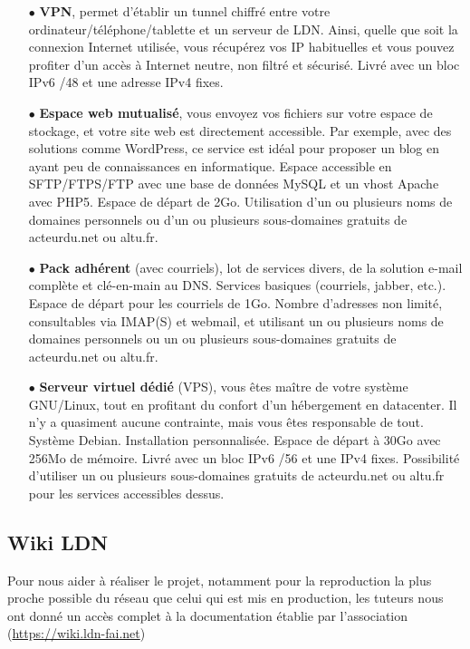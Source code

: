 		\begin{itemize}
			\item[$\bullet$] \textbf{VPN}, permet d’établir un tunnel chiffré entre votre ordinateur/téléphone/tablette et un serveur de LDN. Ainsi, quelle que soit la connexion Internet utilisée, vous récupérez vos IP habituelles et vous pouvez profiter d’un accès à Internet neutre, non filtré et sécurisé. Livré avec un bloc IPv6 /48 et une adresse IPv4 fixes.

			\item[$\bullet$] \textbf{Espace web mutualisé}, vous envoyez vos fichiers sur votre espace de stockage, et votre site web est directement accessible. Par exemple, avec des solutions comme WordPress, ce service est idéal pour proposer un blog en ayant peu de connaissances en informatique. Espace accessible en SFTP/FTPS/FTP avec une base de données MySQL et un vhost Apache avec PHP5. Espace de départ de 2Go. Utilisation d’un ou plusieurs noms de domaines personnels ou d’un ou plusieurs sous-domaines gratuits de acteurdu.net ou altu.fr.

			\item[$\bullet$] \textbf{Pack adhérent} (avec courriels), lot de services divers, de la solution e-mail complète et clé-en-main au DNS. Services basiques (courriels, jabber, etc.). Espace de départ pour les courriels de 1Go. Nombre d’adresses non limité, consultables via IMAP(S) et webmail, et utilisant un ou plusieurs noms de domaines personnels ou un ou plusieurs sous-domaines gratuits de acteurdu.net ou altu.fr.

			\item[$\bullet$] \textbf{Serveur virtuel dédié} (VPS), vous êtes maître de votre système GNU/Linux, tout en profitant du confort d’un hébergement en datacenter. Il n’y a quasiment aucune contrainte, mais vous êtes responsable de tout. Système Debian. Installation personnalisée. Espace de départ à 30Go avec 256Mo de mémoire. Livré avec un bloc IPv6 /56 et une IPv4 fixes. Possibilité d’utiliser un ou plusieurs sous-domaines gratuits de acteurdu.net ou altu.fr pour les services accessibles dessus. \\
		\end{itemize}

	\subsection{Wiki LDN}
		\vspace{0.3cm}
		Pour nous aider à réaliser le projet, notamment pour la reproduction la plus proche possible du réseau que celui qui est mis en production, les tuteurs nous ont donné un accès complet à la documentation établie par l'association (\url{https://wiki.ldn-fai.net})

\newpage
